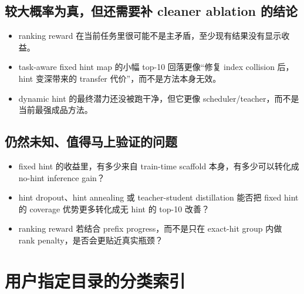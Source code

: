 \documentclass[a4paper]{article}
\begin{document}
\subsection{较大概率为真，但还需要补 cleaner ablation 的结论}

\begin{itemize}
\item ranking reward 在当前任务里很可能不是主矛盾，至少现有结果没有显示收益。
\item task-aware fixed hint map 的小幅 top-10 回落更像“修复 index collision 后，hint 变深带来的 transfer 代价”，而不是方法本身无效。
\item dynamic hint 的最终潜力还没被跑干净，但它更像 scheduler/teacher，而不是当前最强成品方法。
\end{itemize}

\subsection{仍然未知、值得马上验证的问题}

\begin{itemize}
\item fixed hint 的收益里，有多少来自 train-time scaffold 本身，有多少可以转化成 no-hint inference gain？
\item hint dropout、hint annealing 或 teacher-student distillation 能否把 fixed hint 的 coverage 优势更多转化成无 hint 的 top-10 改善？
\item ranking reward 若结合 prefix progress，而不是只在 exact-hit group 内做 rank penalty，是否会更贴近真实瓶颈？
\end{itemize}

\appendix

\section{用户指定目录的分类索引}
\end{document}
